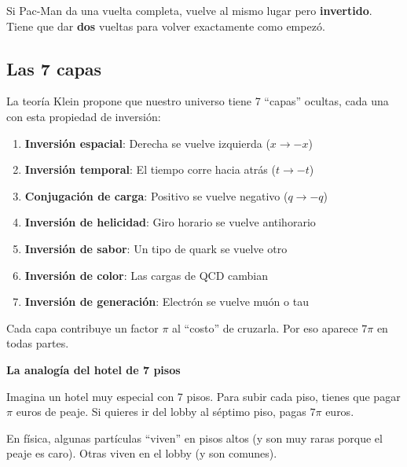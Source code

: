 \documentclass[12pt,a4paper,openany]{book}
\begin{document}
\begin{nivelnarrativo}
\begin{analogiabox}
Si Pac-Man da una vuelta completa, vuelve al mismo lugar pero \textbf{invertido}. Tiene que dar \textbf{dos} vueltas para volver exactamente como empezó.
\end{analogiabox}

\subsection*{Las 7 capas}

La teoría Klein propone que nuestro universo tiene 7 ``capas'' ocultas, cada una con esta propiedad de inversión:

\begin{enumerate}
    \item \textbf{Inversión espacial}: Derecha se vuelve izquierda ($x \to -x$)
    \item \textbf{Inversión temporal}: El tiempo corre hacia atrás ($t \to -t$)
    \item \textbf{Conjugación de carga}: Positivo se vuelve negativo ($q \to -q$)
    \item \textbf{Inversión de helicidad}: Giro horario se vuelve antihorario
    \item \textbf{Inversión de sabor}: Un tipo de quark se vuelve otro
    \item \textbf{Inversión de color}: Las cargas de QCD cambian
    \item \textbf{Inversión de generación}: Electrón se vuelve muón o tau
\end{enumerate}

Cada capa contribuye un factor $\pi$ al ``costo'' de cruzarla. Por eso aparece $7\pi$ en todas partes.

\begin{analogiabox}
\textbf{La analogía del hotel de 7 pisos}

Imagina un hotel muy especial con 7 pisos. Para subir cada piso, tienes que pagar $\pi$ euros de peaje. Si quieres ir del lobby al séptimo piso, pagas $7\pi$ euros.

En física, algunas partículas ``viven'' en pisos altos (y son muy raras porque el peaje es caro). Otras viven en el lobby (y son comunes).
\end{analogiabox}

\end{nivelnarrativo}
\end{document}
